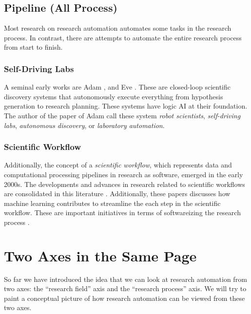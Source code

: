 \subsection{Pipeline (All Process)}
Most research on research automation automates some tasks in the research process. In contrast, there are attempts to automate the entire research process from start to finish.

\subsubsection{Self-Driving Labs}

A seminal early works are Adam \cite{king2004functional}, and Eve \cite{williams2015cheaper}. These are closed-loop scientific discovery systems that autonomously execute everything from hypothesis generation to research planning. These systems have logic AI at their foundation. The author of the paper of Adam call these system \textit{robot scientists}, \textit{self-driving labs}, \textit{autonomous discovery}, or \textit{laboratory automation}.

\subsubsection{Scientific Workflow}

Additionally, the concept of a \textit{scientific workflow}, which represents data and computational processing pipelines in research as software, emerged in the early 2000s. The developments and advances in research related to scientific workflows are consolidated in this literature \cite{barker2008scientific,atkinson2017scientific}. Additionally, these papers \cite{deelman2019role,nouri2021exploring} discusses how machine learning contributes to streamline the each step in the scientific workflow. These are important initiatives in terms of softwareizing the research process \cite{deelman2015pegasus,gil2011semantic}.

\section{Two Axes in the Same Page}

So far we have introduced the idea that we can look at research automation from two axes: the ``research field'' axis and the ``research process'' axis. We will try to paint a conceptual picture of how research automation can be viewed from these two axes.

